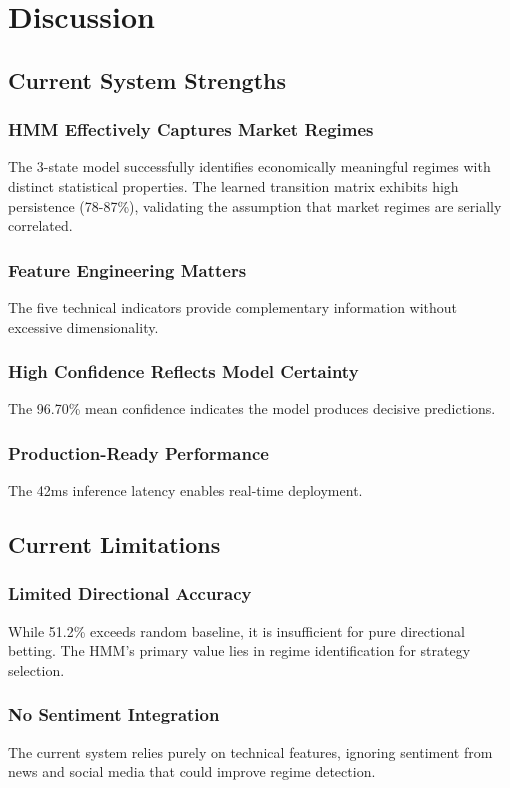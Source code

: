 \documentclass[conference]{IEEEtran}
\begin{document}
\section{Discussion}

\subsection{Current System Strengths}

\subsubsection{HMM Effectively Captures Market Regimes}
The 3-state model successfully identifies economically meaningful regimes with distinct statistical properties. The learned transition matrix exhibits high persistence (78-87\%), validating the assumption that market regimes are serially correlated.

\subsubsection{Feature Engineering Matters}
The five technical indicators provide complementary information without excessive dimensionality.

\subsubsection{High Confidence Reflects Model Certainty}
The 96.70\% mean confidence indicates the model produces decisive predictions.

\subsubsection{Production-Ready Performance}
The 42ms inference latency enables real-time deployment.

\subsection{Current Limitations}

\subsubsection{Limited Directional Accuracy}
While 51.2\% exceeds random baseline, it is insufficient for pure directional betting. The HMM's primary value lies in regime identification for strategy selection.

\subsubsection{No Sentiment Integration}
The current system relies purely on technical features, ignoring sentiment from news and social media that could improve regime detection.
\end{document}
